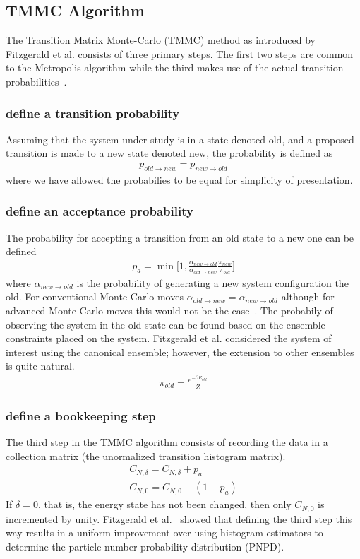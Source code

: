 \documentclass[letterpaper,twocolumn,amsmath,amssymb,pre,aps,10pt]{revtex4-1}
\begin{document}
\subsection{TMMC Algorithm}
The Transition Matrix Monte-Carlo (TMMC) method as introduced by
Fitzgerald et al. consists of three primary steps.  The first two steps
are common to the Metropolis algorithm while the third makes use of the
actual transition probabilities~\cite{fitzgerald2000monte}.

\subsubsection{define a transition probability}
Assuming that the system under study is in a state denoted old, and a
proposed transition is made to a new state denoted new, the probability
is defined as
\begin{align}
  p_{old \rightarrow new} = p_{new \rightarrow old}
\end{align}
where we have allowed the probabilies to be equal for simplicity of
presentation.

\subsubsection{define an acceptance probability}
The probability for accepting a transition from an old state to a new
one can be defined
\begin{align}
  p_{a} = \min\bigg[1,\frac{\alpha_{new\rightarrow old}}
  {\alpha_{old \rightarrow new}}\frac{\pi_{new}}{\pi_{old}}\bigg]
\end{align}
where $\alpha_{new\rightarrow old}$ is the probability of generating a
new system configuration the old.  For conventional Monte-Carlo moves
$\alpha_{old \rightarrow new} =\alpha_{new\rightarrow old}$ although
for advanced Monte-Carlo moves this would not be the
case~\cite{paluch2008comparing, siepmann1990method}.  The probabily of
observing the system in the old state can be found based on the
ensemble constraints placed on the system.  Fitzgerald et al.
considered the system of interest using the canonical ensemble;
however, the extension to other ensembles is quite natural.
\begin{align}
  \pi_{old} = \frac{e^{-\beta E_{old}}}{Z}
\end{align}
\subsubsection{define a bookkeeping step}
The third step in the TMMC algorithm consists of recording the data in
a collection matrix (the unormalized transition histogram matrix).
\begin{align}
  C_{N,\delta} = C_{N,\delta} + p_{a}\\
  C_{N,0} = C_{N,0} +(1 - p_{a})
\end{align} If $\delta=0$, that is, the energy state has not been
changed, then only $C_{N,0}$ is incremented by unity. Fitzgerald et
al.~\cite{fitzgerald2000monte} showed that defining the third step this
way results in a uniform improvement over using histogram estimators to
determine the particle number probability distribution (PNPD).
\end{document}
